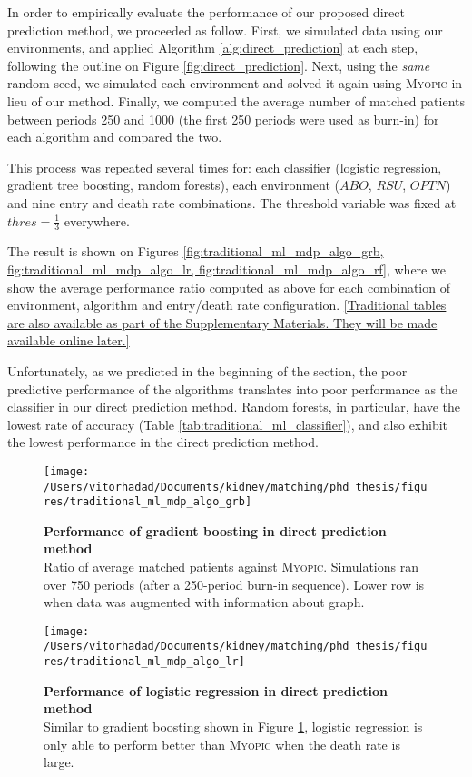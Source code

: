 In order to empirically evaluate the performance of our proposed direct prediction method, we proceeded as follow. First, we simulated data using our environments, and applied Algorithm \ref{alg:direct_prediction} at each step, following the outline on Figure \ref{fig:direct_prediction}. Next, using the \emph{same} random seed, we simulated each environment and solved it again using \textsc{Myopic} in lieu of our method. Finally, we computed the average number of matched patients between periods 250 and 1000 (the first 250 periods were used as burn-in) for each algorithm and compared the two. 

This process was repeated several times for: each classifier (logistic regression, gradient tree boosting, random forests), each environment ($ABO$, $RSU$, $OPTN$) and nine entry and death rate combinations. The threshold variable was fixed at $thres = \frac{1}{3}$ everywhere.

The result is shown on Figures \ref{fig:traditional_ml_mdp_algo_grb, fig:traditional_ml_mdp_algo_lr, fig:traditional_ml_mdp_algo_rf}, where we show the average performance ratio computed as above for each combination of environment, algorithm and entry/death rate configuration. \ref{Traditional tables are also available as part of the Supplementary Materials. They will be made available online later.}

Unfortunately, as we predicted in the beginning of the section, the poor predictive performance of the algorithms translates into poor performance as the classifier in our direct prediction method. Random forests, in particular, have the lowest rate of accuracy (Table \ref{tab:traditional_ml_classifier}), and also exhibit the lowest performance in the direct prediction method.


\begin{figure}
\centering
\texttt{[image: /Users/vitorhadad/Documents/kidney/matching/phd\_thesis/figures/traditional\_ml\_mdp\_algo\_grb]}
\caption[Performance of gradient boosting in direct prediction method]{\textbf{Performance of gradient boosting in direct prediction method} \\
    Ratio of average matched patients against \textsc{Myopic}. Simulations ran over 750 periods (after a 250-period burn-in sequence). Lower row is when data was augmented with information about graph.}
\label{fig:traditional_ml_mdp_algo_grb}
\end{figure}

\begin{figure}
\centering
\texttt{[image: /Users/vitorhadad/Documents/kidney/matching/phd\_thesis/figures/traditional\_ml\_mdp\_algo\_lr]}
\caption[Performance of logistic regression in direct prediction method]{\textbf{Performance of logistic regression in direct prediction method} \\
    Similar to gradient boosting shown in Figure \ref{fig:traditional_ml_mdp_algo_grb}, logistic regression is only able to perform better than \textsc{Myopic} when the death rate is large.}
\label{fig:traditional_ml_mdp_algo_lr}
\end{figure}

